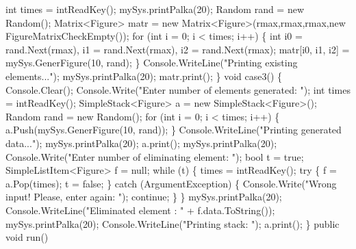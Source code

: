 \begin{DoxyCode}
            \textcolor{keywordtype}{int} times = intReadKey();
            mySys.printPalka(20);
            Random rand = \textcolor{keyword}{new} Random();
            Matrix<Figure> matr = \textcolor{keyword}{new} Matrix<Figure>(rmax,rmax,rmax,\textcolor{keyword}{new} FigureMatrixCheckEmpty());
            \textcolor{keywordflow}{for} (\textcolor{keywordtype}{int} i = 0; i < times; i++)
            \{
                \textcolor{keywordtype}{int} i0 = rand.Next(rmax), i1 = rand.Next(rmax), i2 = rand.Next(rmax);
                matr[i0, i1, i2] = mySys.GenerFigure(10, rand);
            \}
            Console.WriteLine(\textcolor{stringliteral}{"Printing existing elements..."});
            mySys.printPalka(20);
            matr.print();
        \}
        \textcolor{keywordtype}{void} case3()
        \{
            Console.Clear();
            Console.Write(\textcolor{stringliteral}{"Enter number of elements generated: "});
            \textcolor{keywordtype}{int} times = intReadKey();
            SimpleStack<Figure> a = \textcolor{keyword}{new} SimpleStack<Figure>();
            Random rand = \textcolor{keyword}{new} Random();
            \textcolor{keywordflow}{for} (\textcolor{keywordtype}{int} i = 0; i < times; i++)
            \{
                a.Push(mySys.GenerFigure(10, rand));
            \}
            Console.WriteLine(\textcolor{stringliteral}{"Printing generated data..."});
            mySys.printPalka(20);
            a.print();
            mySys.printPalka(20);
            Console.Write(\textcolor{stringliteral}{"Enter number of eliminating element: "});
            \textcolor{keywordtype}{bool} t = \textcolor{keyword}{true};
            SimpleListItem<Figure> f = null;
            \textcolor{keywordflow}{while} (t)
            \{
                times = intReadKey();
                \textcolor{keywordflow}{try}
                \{
                    f = a.Pop(times);
                    t = \textcolor{keyword}{false};
                \}
                \textcolor{keywordflow}{catch} (ArgumentException)
                \{
                    Console.Write(\textcolor{stringliteral}{"Wrong input! Please, enter again: "});
                    \textcolor{keywordflow}{continue};
                \}
            \}
            mySys.printPalka(20);
            Console.WriteLine(\textcolor{stringliteral}{"Eliminated element : "} + f.data.ToString());
            mySys.printPalka(20);
            Console.WriteLine(\textcolor{stringliteral}{"Printing stack: "});
            a.print();
        \}
        \textcolor{keyword}{public} \textcolor{keywordtype}{void} run()

\end{DoxyCode}
